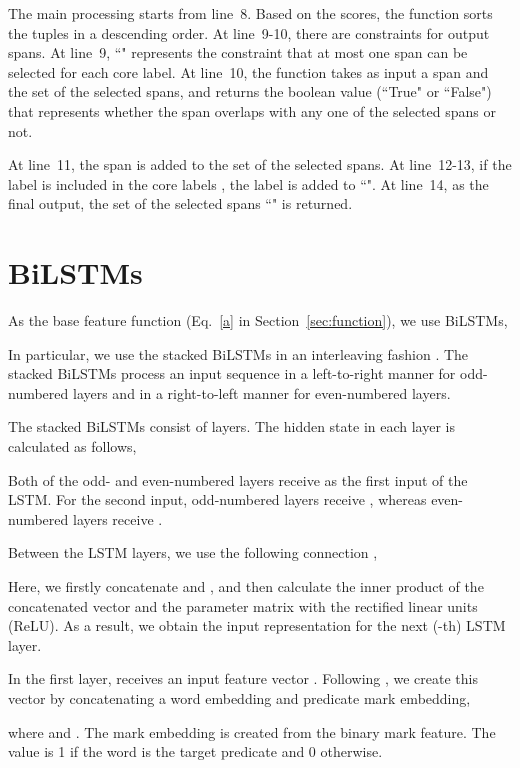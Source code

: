 \documentclass[11pt,a4paper]{article}
\begin{document}
The main processing starts from line~8.
Based on the scores, the function  sorts the tuples  in a descending order.
At line~9-10, there are constraints for output spans.
At line~9, ``" represents the constraint that at most one span can be selected for each core label.
At line~10, the function  takes as input a span  and the set of the selected spans, and returns the boolean value (``True" or ``False") that represents whether the span overlaps with any one of the selected spans or not.

At line~11, the span is added to the set of the selected spans.
At line~12-13, if the label  is included in the core labels , the label is added to ``".
At line~14, as the final output, the set of the selected spans ``" is returned.

\section{BiLSTMs}
\label{sec:lstm}

As the base feature function  (Eq.~\ref{a} in Section~\ref{sec:function}), we use BiLSTMs,


\noindent
In particular, we use the stacked BiLSTMs in an interleaving fashion \cite{zhou:15,he:17}.
The stacked BiLSTMs process an input sequence in a left-to-right manner for odd-numbered layers and in a right-to-left manner for even-numbered layers.

The stacked BiLSTMs consist of  layers.
The hidden state in each layer  is calculated as follows,


\noindent
Both of the odd- and even-numbered layers receive  as the first input of the LSTM.
For the second input, odd-numbered layers receive , whereas even-numbered layers receive .

Between the LSTM layers, we use the following connection \cite{zhou:15},


\noindent
Here, we firstly concatenate  and , and then calculate the inner product of the concatenated vector and the parameter matrix  with the rectified linear units (ReLU).
As a result, we obtain the input representation  for the next (-th) LSTM layer.

In the first layer,  receives an input feature vector .
Following , we create this vector by concatenating a word embedding and predicate mark embedding,


\noindent
where  and .
The mark embedding is created from the binary mark feature.
The value is 1 if the word is the target predicate and 0 otherwise.
\end{document}
